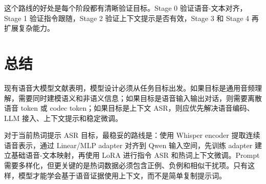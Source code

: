 \documentclass[UTF8,fontset=fandol]{ctexart}
\begin{document}
这个路线的好处是每个阶段都有清晰验证目标。Stage 0 验证语音-文本对齐，Stage 1 验证指令跟随，Stage 2 验证上下文提示是否有效，Stage 3 和 Stage 4 再扩展复杂能力。

\section{总结}

现有语音大模型文献表明，模型设计必须从任务目标出发。如果目标是通用音频理解，需要同时建模语义和非语义信息；如果目标是语音输入输出对话，则需要离散语音 token 或 codec token；如果目标是上下文 ASR，则应优先解决语音编码、LLM 接入、上下文提示和稳定微调。

对于当前热词提示 ASR 目标，最稳妥的路线是：使用 Whisper encoder 提取连续语音表示，通过 Linear/MLP adapter 对齐到 Qwen 输入空间，先训练 adapter 建立基础语音-文本映射，再使用 LoRA 进行指令 ASR 和热词上下文微调。Prompt 需要多样化，但更关键的是热词数据必须包含正例、负例和相似干扰项。只有这样，模型才能学会基于语音证据使用上下文，而不是简单复制提示词。
\end{document}
